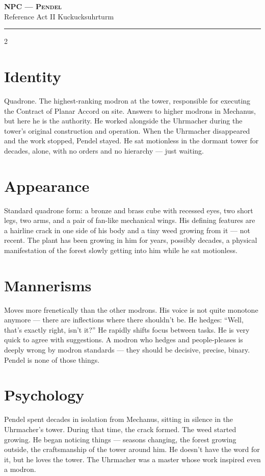 \documentclass[10pt,letterpaper]{article}
\newcommand{\sceneheader}[4]{%
  \fancyhead[L]{\small\textcolor{accent}{\scshape #1}}%
  \fancyhead[R]{\small\textcolor{accent}{#2 \quad \textbullet \quad #3}}%
  \begin{center}
  {\LARGE\bfseries\scshape\textcolor{accent}{#1}}\\[2pt]
  {\small #2 \quad \textbullet \quad #3 \quad \textbullet \quad #4}\\[2pt]
  \textcolor{rulecol}{\rule{0.5\textwidth}{0.8pt}}
  \end{center}
  \vspace{-4pt}
}
\begin{document}

\label{sec:npc-pendel}\sceneheader{NPC --- Pendel}{Reference}{Act II}{Kuckucksuhrturm}

\begin{multicols}{2}

\section*{Identity}
Quadrone. The highest-ranking modron at the tower, responsible for executing the Contract of Planar Accord on site. Answers to higher modrons in Mechanus, but here he is the authority. He worked alongside the Uhrmacher during the tower's original construction and operation. When the Uhrmacher disappeared and the work stopped, Pendel stayed. He sat motionless in the dormant tower for decades, alone, with no orders and no hierarchy --- just waiting.

\section*{Appearance}
Standard quadrone form: a bronze and brass cube with recessed eyes, two short legs, two arms, and a pair of fan-like mechanical wings. His defining features are a hairline crack in one side of his body and a tiny weed growing from it --- not recent. The plant has been growing in him for years, possibly decades, a physical manifestation of the forest slowly getting into him while he sat motionless.

\section*{Mannerisms}
Moves more frenetically than the other modrons. His voice is not quite monotone anymore --- there are inflections where there shouldn't be. He hedges: ``Well, that's exactly right, isn't it?'' He rapidly shifts focus between tasks. He is very quick to agree with suggestions. A modron who hedges and people-pleases is deeply wrong by modron standards --- they should be decisive, precise, binary. Pendel is none of those things.

\section*{Psychology}
Pendel spent decades in isolation from Mechanus, sitting in silence in the Uhrmacher's tower. During that time, the crack formed. The weed started growing. He began noticing things --- seasons changing, the forest growing outside, the craftsmanship of the tower around him. He doesn't have the word for it, but he loves the tower. The Uhrmacher was a master whose work inspired even a modron.


\end{multicols}
\end{document}
